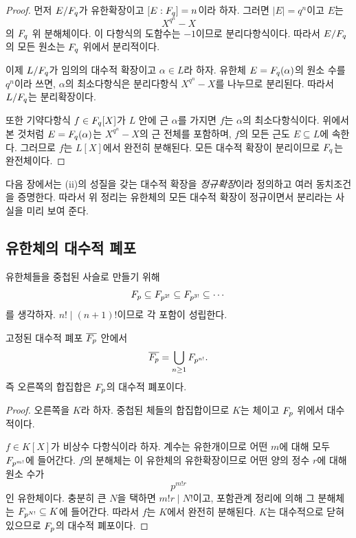 \begin{proof}
먼저 $E/F_q$가 유한확장이고 $[E:F_q]=n$이라 하자. 그러면 $|E|=q^n$이고 $E$는
\[
  X^{q^n}-X
\]
의 $F_q$ 위 분해체이다. 이 다항식의 도함수는 $-1$이므로 분리다항식이다. 따라서 $E/F_q$의 모든 원소는 $F_q$ 위에서 분리적이다.

이제 $L/F_q$가 임의의 대수적 확장이고 $\alpha\in L$라 하자. 유한체 $E=F_q(\alpha)$의 원소 수를 $q^n$이라 쓰면, $\alpha$의 최소다항식은 분리다항식 $X^{q^n}-X$를 나누므로 분리된다. 따라서 $L/F_q$는 분리확장이다.

또한 기약다항식 $f\in F_q[X]$가 $L$ 안에 근 $\alpha$를 가지면 $f$는 $\alpha$의 최소다항식이다. 위에서 본 것처럼 $E=F_q(\alpha)$는 $X^{q^n}-X$의 근 전체를 포함하며, $f$의 모든 근도 $E\subseteq L$에 속한다. 그러므로 $f$는 $L[X]$에서 완전히 분해된다. 모든 대수적 확장이 분리이므로 $F_q$는 완전체이다.
\end{proof}

\begin{remark}
다음 장에서는 (ii)의 성질을 갖는 대수적 확장을 \emph{정규확장}이라 정의하고 여러 동치조건을 증명한다. 따라서 위 정리는 유한체의 모든 대수적 확장이 정규이면서 분리라는 사실을 미리 보여 준다.
\end{remark}

\subsection{유한체의 대수적 폐포}

유한체들을 중첩된 사슬로 만들기 위해
\[
  F_p\subseteq F_{p^{2!}}\subseteq F_{p^{3!}}
  \subseteq\cdots
\]
를 생각하자. $n!\mid(n+1)!$이므로 각 포함이 성립한다.

\begin{theorem}
고정된 대수적 폐포 $\overline{F_p}$ 안에서
\[
  \overline{F_p}
  =\bigcup_{n\ge1}F_{p^{n!}}.
\]
즉 오른쪽의 합집합은 $F_p$의 대수적 폐포이다.
\end{theorem}

\begin{proof}
오른쪽을 $K$라 하자. 중첩된 체들의 합집합이므로 $K$는 체이고 $F_p$ 위에서 대수적이다.

$f\in K[X]$가 비상수 다항식이라 하자. 계수는 유한개이므로 어떤 $m$에 대해 모두 $F_{p^{m!}}$에 들어간다. $f$의 분해체는 이 유한체의 유한확장이므로 어떤 양의 정수 $r$에 대해 원소 수가
\[
  p^{m!r}
\]
인 유한체이다. 충분히 큰 $N$을 택하면 $m!r\mid N!$이고, 포함관계 정리에 의해 그 분해체는 $F_{p^{N!}}\subseteq K$에 들어간다. 따라서 $f$는 $K$에서 완전히 분해된다. $K$는 대수적으로 닫혀 있으므로 $F_p$의 대수적 폐포이다.
\end{proof}


